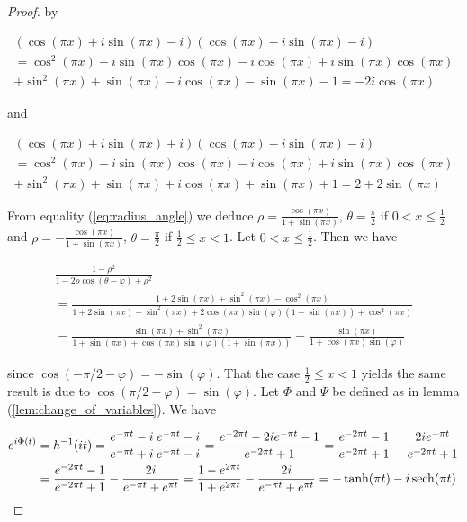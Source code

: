 \begin{proof}
by

\begin{multline*}
	\left(\cos(\pi x) + i\sin(\pi x) - i\right)\left(\cos(\pi x) - i\sin(\pi x) - i\right)\\ = \cos^2(\pi x) - i\sin(\pi x)\cos(\pi x)	
		-i\cos(\pi x) + i\sin(\pi x)\cos(\pi x)\\
	 	+ \sin^2(\pi x) + \sin(\pi x) - i \cos(\pi x) - \sin(\pi x) - 1 = -2i \cos(\pi x)  
\end{multline*}

and
	
\begin{multline*}
	\left( \cos(\pi x) + i\sin(\pi x) + i \right)\left( \cos(\pi x) - i\sin(\pi x) - i \right)\\ = \cos^2(\pi x) - i\sin(\pi x)\cos(\pi x) - i\cos(\pi x) + i\sin(\pi x)\cos(\pi x)\\
	+ \sin^2(\pi x) + \sin(\pi x)+ i \cos(\pi x) + \sin(\pi x) + 1 = 2 + 2\sin(\pi x)
\end{multline*}

	From equality (\ref{eq:radius_angle}) we deduce $\rho = \frac{\cos(\pi x)}{1 + \sin(\pi x)}$, $\theta = \frac{\pi}{2}$ if $0 < x \leq \frac{1}{2}$ and $\rho = -\frac{\cos(\pi x)}{1 + \sin(\pi x)}$, $\theta = \frac{\pi}{2}$ if $\frac{1}{2} \leq x < 1$. Let $0 < x \leq \frac{1}{2}$. Then we have

\begin{multline*}
	\frac{1 - \rho^2}{1 - 2\rho\cos(\theta - \varphi) + \rho^2} \\= \frac{1 + 2\sin(\pi x) + \sin^2(\pi x) - \cos^2(\pi x)}{1 + 2\sin(\pi x) + \sin^2(\pi x) + 2\cos(\pi x)\sin(\varphi)(1 + \sin(\pi x)) + \cos^2(\pi x)}\\
	= \frac{\sin(\pi x) + \sin^2(\pi x)}{1 + \sin(\pi x) + \cos(\pi x)\sin(\varphi)(1 + \sin(\pi x))}
	= \frac{\sin(\pi x)}{1 + \cos(\pi x)\sin(\varphi)}
\end{multline*}

	since $\cos\left( -\pi/2 - \varphi \right) = -\sin(\varphi)$. That the case $\frac{1}{2} \leq x < 1$ yields the same result is due to $\cos(\pi/2 - \varphi) = \sin(\varphi)$. Let $\Phi$ and $\Psi$ be defined as in lemma (\ref{lem:change_of_variables}). We have 
				
\begin{gather*}
	\begin{aligned}
		e^{i\Phi(t)} &= h^{-1}(it) = \frac{e^{-\pi t} - i}{e^{-\pi t} + i} \frac{e^{-\pi t} - i}{e^{-\pi t} - i} = \frac{e^{-2\pi t} - 2ie^{-\pi t} - 1}{e^{-2\pi t} + 1} = \frac{e^{-2\pi t} - 1}{e^{-2\pi t} + 1} - \frac{2ie^{-\pi t}}{e^{-2\pi t} + 1}\\ 
		&= \frac{e^{-2\pi t} - 1}{e^{-2\pi t} + 1} - \frac{2i}{e^{-\pi t} + e^{\pi t}} = \frac{1 - e^{2\pi t}}{1 + e^{2\pi t}} - \frac{2i}{e^{-\pi t} + e^{\pi t}} = -\tanh (\pi t) - i \operatorname{sech}(\pi t)
	\end{aligned}
\end{gather*}
	

\end{proof}
